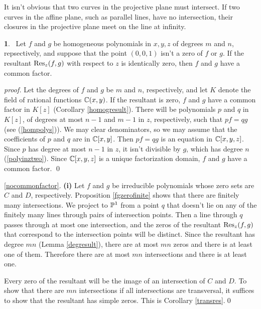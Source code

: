 \documentclass[leqno]{book}
\newcommand\Marginnote[1]{\marginnote{\hspace{-12pt}\normalfont{#1}}}
\theoremstyle{definition}%
\numberwithin{equation}{section}
\theoremstyle{theorem} %
\newtheorem{lemma}[equation]{}
\renewenvironment{proof}{\no \emph{proof.}}{}
\begin{document}
\msno It isn't obvious that two curves in the projective plane must
intersect.  If two curves in the affine plane, such as parallel lines,
have no intersection, their closures in the projective
plane meet on the line at infinity.


\begin{lemma}{}\Marginnote{resnotzero}\;\,
Let $f$ and $g$ be homogeneous polynomials in $x,y,z$ of degrees $m$
and $n$, repsectively, and suppose that the point $(0,0,1)$ isn't a
zero of $f$ or $g$.  If the resultant $\operatorname{Res}_z(f,g)$ with respect
to $z$ is identically zero, then $f$ and $g$ have a common factor.
\label{resnotzero} \end{lemma}

\begin{proof} Let  the degrees of $f$ and $g$ be $m$ and $n$,
respectively, and let $K$ denote the field of rational functions
$\mathbb{C}(x,y)$.  If the resultant is zero, $f$ and $g$ have a
common factor in $K[z]$ (Corollary \ref{homogresult}).  There will be
polynomials $p$ and $q$ in $K[z]$, of degrees at most $n\!-\!1$ and
$m\!-\!1$ in $z$, respectively, such that $pf = qg$ (see
(\ref{hompolys})).  We may clear denominators, so we may assume that
the coefficients of $p$ and $q$ are in $\mathbb{C}[x,y]$.  Then $pf=qg$ is
an equation in $\mathbb{C}[x,y,z]$.  Since $p$ has degree at most $n\!-\!1$
in $z$, it isn't divisible by $g$, which has degree $n$
(\ref{polyinztwo}).  Since $\mathbb{C}[x,y,z]$ is a unique factorization
domain, $f$ and $g$ have a common factor.  \qed\end{proof}


 \ref{nocommonfactor}.\; {\bf (i)} Let
$f$ and $g$ be irreducible polynomials whose zero sets are $C$ and
$D$, respectively.  Proposition \ref{fgzerofinite} shows that there
are finitely many intersections.  We project to $\mathbb{P}^1$ from a point
$q$ that doesn't lie on any of the finitely many lines through pairs
of intersection points.  Then a line through $q$ passes through at
most one intersection, and the zeros of the resultant $\operatorname{Res}_z(f,g)$
that correspond to the intersection points will be distinct.  Since
the resultant has degree $mn$ (Lemma \ref{degresult}), there are at
most $mn$ zeros and there is at least one of them.  Therefore there
are at most $mn$ intersections and there is at least one.

 Every zero of the resultant will be the image of an
intersection of $C$ and $D$.  To show that there are $mn$
intersections if all intersections are transversal, it suffices to
show that the resultant has simple zeros.  This is Corollary
\ref{transres}.\qed
\end{document}
